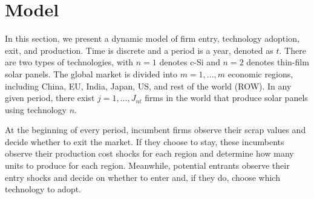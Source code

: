 \documentclass[12pt, letter]{article}
\begin{document}

\newpage


\section{Model}
In this section, we present a dynamic model of firm entry, technology adoption, exit, and production. Time is discrete and a period is a year, denoted as $t$. There are two types of technologies, with $n=1$ denotes c-Si and $n=2$ denotes thin-film solar panels. The global market is divided into $m=1,...,m$ economic regions, including China, EU, India, Japan, US, and rest of the world (ROW). In any given period, there exist $j = 1,...,J_{nt}$ firms in the world that produce solar panels using technology $n$. 

At the beginning of every period, incumbent firms observe their scrap values and decide whether to exit the market. If they choose to stay, these incumbents observe their production cost shocks for each region and determine how many units to produce for each region. Meanwhile, potential entrants observe their entry shocks and decide on whether to enter and, if they do, choose which technology to adopt. 


\end{document}
